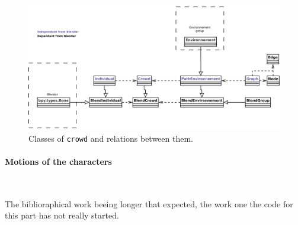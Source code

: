 \begin{figure}[h]
  \includegraphics[width=15cm]{crowd_final.pdf}
  \caption{Classes of \texttt{crowd} and relations between them.}
  \label{crowd_classes}
\end{figure}

\paragraph{Motions of the characters}~

\noindent The biblioraphical work beeing longer that expected, the work one the code for this part has not really started.
